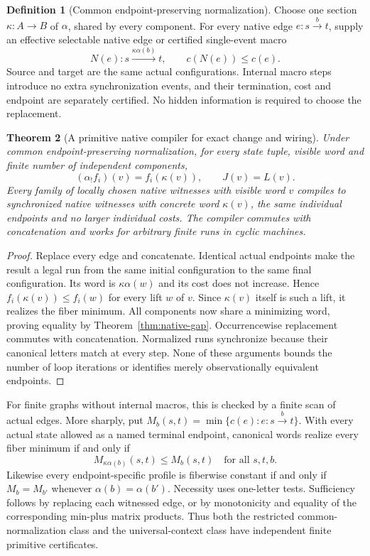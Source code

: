 \documentclass[11pt]{article}
\newtheorem{theorem}{Theorem}[section]
\theoremstyle{definition}\newtheorem{definition}[theorem]{Definition}
\theoremstyle{remark}\newtheorem{remark}[theorem]{Remark}
\begin{document}
\begin{definition}[Common endpoint-preserving normalization]
Choose one section $\kappa:A\to B$ of $\alpha$, shared by every
component. For every native edge $e:s\xrightarrow{b}t$, supply an
effective selectable native edge or certified single-event macro
\[
 N(e):s\xrightarrow{\kappa\alpha(b)}t,
 \qquad c(N(e))\leq c(e).
\]
Source and target are the same actual configurations. Internal macro steps
introduce no extra synchronization events, and their termination, cost
and endpoint are separately certified. No hidden information is required
to choose the replacement.
\end{definition}

\begin{theorem}[A primitive native compiler for exact change and wiring]
\label{thm:native-normal}
Under common endpoint-preserving normalization, for every state tuple,
visible word and finite number of independent components,
\[
 (\alpha_!f_i)(v)=f_i(\kappa(v)),\qquad J(v)=L(v).
\]
Every family of locally chosen native witnesses with visible word $v$
compiles to synchronized native witnesses with concrete word $\kappa(v)$,
the same individual endpoints and no larger individual costs. The compiler
commutes with concatenation and works for arbitrary finite runs in cyclic
machines.
\end{theorem}
\begin{proof}
Replace every edge and concatenate. Identical actual endpoints make the
result a legal run from the same initial configuration to the same final
configuration. Its word is $\kappa\alpha(w)$ and its cost does not
increase. Hence $f_i(\kappa(v))\leq f_i(w)$ for every lift $w$ of $v$.
Since $\kappa(v)$ itself is such a lift, it realizes the fiber minimum.
All components now share a minimizing word, proving equality by
Theorem~\ref{thm:native-gap}. Occurrencewise replacement commutes with
concatenation. Normalized runs synchronize because their canonical letters
match at every step. None of these arguments bounds the number of loop
iterations or identifies merely observationally equivalent endpoints.
\end{proof}

For finite graphs without internal macros, this is checked by a finite
scan of actual edges. More sharply, put
$M_b(s,t)=\min\{c(e):e:s\xrightarrow b t\}$. With every actual state
allowed as a named terminal endpoint, canonical words realize every fiber
minimum if and only if
\[
 M_{\kappa\alpha(b)}(s,t)\leq M_b(s,t)\quad\text{for all }s,t,b.
\]
Likewise every endpoint-specific profile is fiberwise constant if and only
if $M_b=M_{b'}$ whenever $\alpha(b)=\alpha(b')$.
Necessity uses one-letter tests. Sufficiency follows by replacing each
witnessed edge, or by monotonicity and equality of the corresponding
min-plus matrix products. Thus both the restricted common-normalization
class and the universal-context class have independent finite primitive
certificates.
\end{document}
